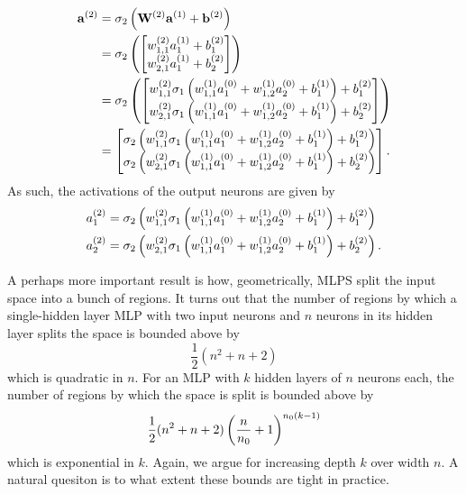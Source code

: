 \documentclass[11pt]{article}
\begin{document}
\begin{align*}
\mathbf{a}^{(2)}
&=
\sigma_2\left(\mathbf{W}^{(2)}\mathbf{a}^{(1)}+\mathbf{b}^{(2)}\right)\\
&=
\sigma_2\left(
\begin{bmatrix}
    w_{1,1}^{(2)}a_1^{(1)} + b_1^{(2)}\\
    w_{2,1}^{(2)}a_1^{(1)} + b_2^{(2)}
\end{bmatrix}
\right)\\
&=
\sigma_2\left(
\begin{bmatrix}
    w_{1,1}^{(2)}\sigma_1\left(w_{1,1}^{(1)}a_1^{(0)}+w_{1,2}^{(1)}a_2^{(0)}+b_1^{(1)}\right) + b_1^{(2)}\\
    w_{2,1}^{(2)}\sigma_1\left(w_{1,1}^{(1)}a_1^{(0)}+w_{1,2}^{(1)}a_2^{(0)}+b_1^{(1)}\right) + b_2^{(2)}
\end{bmatrix}
\right)\\
&=
\begin{bmatrix}
    \sigma_2\left(w_{1,1}^{(2)}\sigma_1\left(w_{1,1}^{(1)}a_1^{(0)}+w_{1,2}^{(1)}a_2^{(0)}+b_1^{(1)}\right) + b_1^{(2)}\right)\\
    \sigma_2\left(w_{2,1}^{(2)}\sigma_1\left(w_{1,1}^{(1)}a_1^{(0)}+w_{1,2}^{(1)}a_2^{(0)}+b_1^{(1)}\right) + b_2^{(2)}\right)
\end{bmatrix}.
\end{align*}
As such, the activations of the output neurons are given by
\begin{align*}
    a_1^{(2)}&=\sigma_2\left(w_{1,1}^{(2)}\sigma_1\left(w_{1,1}^{(1)}a_1^{(0)}+w_{1,2}^{(1)}a_2^{(0)}+b_1^{(1)}\right) + b_1^{(2)}\right)\\
    a_2^{(2)}&=\sigma_2\left(w_{2,1}^{(2)}\sigma_1\left(w_{1,1}^{(1)}a_1^{(0)}+w_{1,2}^{(1)}a_2^{(0)}+b_1^{(1)}\right) + b_2^{(2)}\right).
\end{align*}

\begin{tcolorbox}[title={\centering\textbf{Further advocating for depth over width}}, colback=myLightBlue, colbacktitle=myDarkBlue, colframe=myDarkBlue, coltitle=white]
    A perhaps more important result is how, geometrically, MLPS split the input space into a bunch of regions. It turns out that the number of regions by which a single-hidden layer MLP with two input neurons and $n$ neurons in its hidden layer splits the space is bounded above by
    $$
    \frac{1}{2}(n^2+n+2)
    $$
    which is quadratic in $n$. For an MLP with $k$ hidden layers of $n$ neurons each, the number of regions by which the space is split is bounded above by
    $$
    \frac{1}{2}(n^2+n+2)\left(\frac{n}{n_0}+1\right)^{n_0(k-1)}
    $$
    which is exponential in $k$. Again, we argue for increasing depth $k$ over width $n$. A natural quesiton is to what extent these bounds are tight in practice.
\end{tcolorbox}
\end{document}
